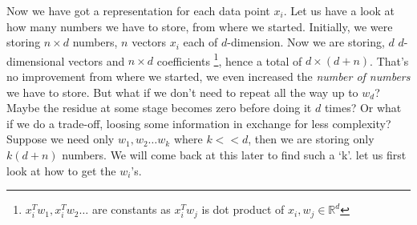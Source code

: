 \documentclass[12pt,a4paper]{article}
\begin{document}
Now we have got a representation for each data point $x_i$. Let us have a look at how many numbers we have to store, from where we started. Initially, we  were storing $n \times d$ numbers, $n$ vectors $x_i$ each of $d$-dimension. Now we are storing, $d$ $d$-dimensional vectors and $n \times d$ coefficients \footnote{\quad $x_i^Tw_1, x_i^Tw_2 \dots$ are constants as $x_i^Tw_j$ is dot product of $x_i, w_j \in \mathbb{R}^d$}, hence a total of $d \times (d +n)$. That's no improvement from where we started, we even increased the \textit{number of numbers} we have to store. But what if we don't need to repeat all the way up to $w_d$? Maybe the residue at some stage becomes zero before doing it $d$ times? Or what if we do a trade-off, loosing some information in exchange for less complexity? Suppose we need only $w_1,w_2 \dots w_k$ where $k<<d$, then we are storing only $k(d+n)$ numbers. We will come back at this later to find such a `k'. let us first look at how to get the $w_i$'s.
\end{document}
